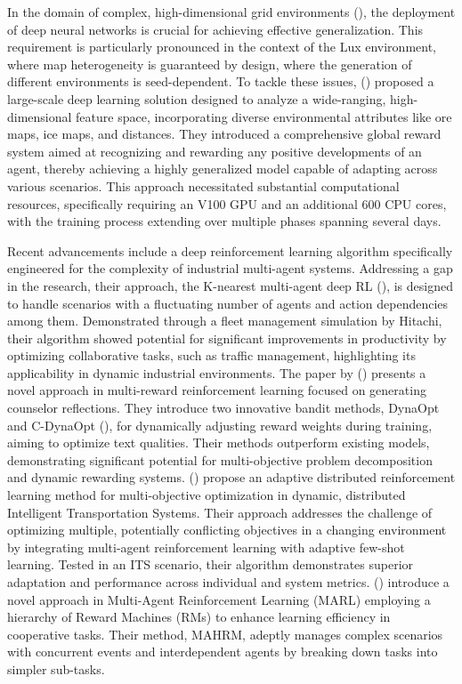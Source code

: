 \noindent In the domain of complex, high-dimensional grid environments (\textcolor{deepblue}{\cite{eberhardinger2023learning}}), the deployment of deep neural networks is crucial for achieving effective generalization. This requirement is particularly pronounced in the context of the Lux environment, where map heterogeneity is guaranteed by design, where the generation of different environments is seed-dependent. To tackle these issues, (\textcolor{deepblue}{\cite{chen2023emergent}}) proposed a large-scale deep learning solution designed to analyze a wide-ranging, high-dimensional feature space, incorporating diverse environmental attributes like ore maps, ice maps, and distances. They introduced a comprehensive global reward system aimed at recognizing and rewarding any positive developments of an agent, thereby achieving a highly generalized model capable of adapting across various scenarios. This approach necessitated substantial computational resources, specifically requiring an V100 GPU and an additional 600 CPU cores, with the training process extending over multiple phases spanning several days.

\bigskip

\noindent Recent advancements include a deep reinforcement learning algorithm specifically engineered for the complexity of industrial multi-agent systems. Addressing a gap in the research, their approach, the K-nearest multi-agent deep RL (\textcolor{deepblue}{\cite{khorasgani2022knearest}}), is designed to handle scenarios with a fluctuating number of agents and action dependencies among them. Demonstrated through a fleet management simulation by Hitachi, their algorithm showed potential for significant improvements in productivity by optimizing collaborative tasks, such as traffic management, highlighting its applicability in dynamic industrial environments. The paper by (\textcolor{deepblue}{\cite{min2024dynamic}}) presents a novel approach in multi-reward reinforcement learning focused on generating counselor reflections. They introduce two innovative bandit methods, DynaOpt and C-DynaOpt (\textcolor{deepblue}{\cite{min2024dynamic}}), for dynamically adjusting reward weights during training, aiming to optimize text qualities. Their methods outperform existing models, demonstrating significant potential for multi-objective problem decomposition and dynamic rewarding systems. (\textcolor{deepblue}{\cite{Tan_2024}}) propose an adaptive distributed reinforcement learning method for multi-objective optimization in dynamic, distributed Intelligent Transportation Systems. Their approach addresses the challenge of optimizing multiple, potentially conflicting objectives in a changing environment by integrating multi-agent reinforcement learning with adaptive few-shot learning. Tested in an ITS scenario, their algorithm demonstrates superior adaptation and performance across individual and system metrics. (\textcolor{deepblue}{\cite{zheng2024multiagent}}) introduce a novel approach in Multi-Agent Reinforcement Learning (MARL) employing a hierarchy of Reward Machines (RMs) to enhance learning efficiency in cooperative tasks. Their method, MAHRM, adeptly manages complex scenarios with concurrent events and interdependent agents by breaking down tasks into simpler sub-tasks. 


